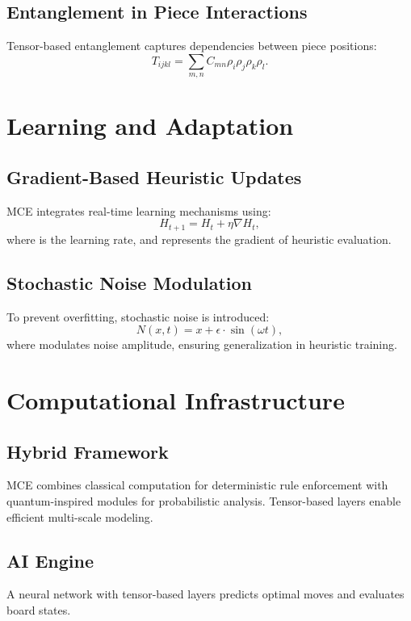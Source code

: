 \documentclass{article}
\begin{document}
\subsection{Entanglement in Piece Interactions} Tensor-based entanglement captures dependencies between piece positions: \begin{equation} T_{ijkl} = \sum_{m,n} C_{mn} \rho_i \rho_j \rho_k \rho_l. \end{equation}

\section{Learning and Adaptation} \subsection{Gradient-Based Heuristic Updates} MCE integrates real-time learning mechanisms using: \begin{equation} H_{t+1} = H_t + \eta \nabla H_t, \end{equation} where  is the learning rate, and  represents the gradient of heuristic evaluation.

\subsection{Stochastic Noise Modulation} To prevent overfitting, stochastic noise is introduced: \begin{equation} N(x, t) = x + \epsilon \cdot \sin(\omega t), \end{equation} where  modulates noise amplitude, ensuring generalization in heuristic training.

\section{Computational Infrastructure} \subsection{Hybrid Framework} MCE combines classical computation for deterministic rule enforcement with quantum-inspired modules for probabilistic analysis. Tensor-based layers enable efficient multi-scale modeling.

\subsection{AI Engine} A neural network with tensor-based layers predicts optimal moves and evaluates board states.
\end{document}
